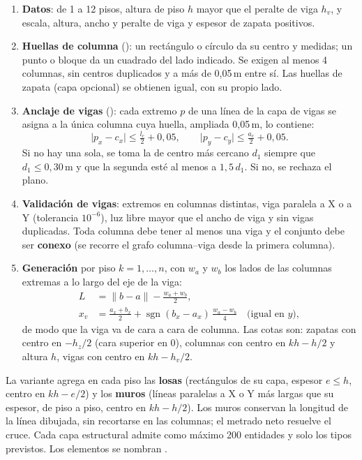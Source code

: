 \begin{enumerate}
	\item \textbf{Datos}: de 1 a 12 pisos, altura de piso $h$ mayor que el peralte de viga $h_v$, y escala, altura,
	      ancho y peralte de viga y espesor de zapata positivos.
	\item \textbf{Huellas de columna} (): un rectángulo o círculo da su centro y medidas; un
	      punto o bloque da un cuadrado del lado indicado. Se exigen al menos 4 columnas, sin centros duplicados y a más
	      de 0,05\,m entre sí. Las huellas de zapata (capa opcional) se obtienen igual, con su propio lado.
	\item \textbf{Anclaje de vigas} (): cada extremo $p$ de una línea de la capa de vigas
	      se asigna a la única columna cuya huella, ampliada 0,05\,m, lo contiene:
	      \begin{equation}
	      	\lvert p_x - c_x \rvert \le \tfrac{l_c}{2} + 0{,}05, \qquad \lvert p_y - c_y \rvert \le \tfrac{a_c}{2} + 0{,}05 .
	      \end{equation}
	      Si no hay una sola, se toma la de centro más cercano $d_1$ siempre que $d_1 \le 0{,}30$\,m y que la segunda
	      esté al menos a $1{,}5\,d_1$. Si no, se rechaza el plano.
	\item \textbf{Validación de vigas}: extremos en columnas distintas, viga paralela a X o a Y (tolerancia
	      $10^{-6}$), luz libre mayor que el ancho de viga y sin vigas duplicadas. Toda columna debe tener al menos una
	      viga y el conjunto debe ser \textbf{conexo} (se recorre el grafo columna--viga desde la primera columna).
	\item \textbf{Generación} por piso $k = 1, \dots, n$, con $w_a$ y $w_b$ los lados de las columnas extremas a lo
	      largo del eje de la viga:
	      \begin{align}
	      	L &= \lVert b - a \rVert - \tfrac{w_a + w_b}{2}, \\
	      	x_v &= \tfrac{a_x + b_x}{2} + \operatorname{sgn}(b_x - a_x)\, \tfrac{w_a - w_b}{4}
	      	\quad \text{(igual en } y\text{)},
	      \end{align}
	      de modo que la viga va de cara a cara de columna. Las cotas son: zapatas con centro en $-h_z/2$ (cara superior
	      en 0), columnas con centro en $k h - h/2$ y altura $h$, vigas con centro en $k h - h_v/2$.
\end{enumerate}

La variante  agrega en cada piso las \textbf{losas} (rectángulos
de su capa, espesor $e \le h$, centro en $k h - e/2$) y los \textbf{muros} (líneas paralelas a X o Y más largas que su
espesor, de piso a piso, centro en $k h - h/2$). Los muros conservan la longitud de la línea dibujada, sin recortarse
en las columnas; el metrado neto resuelve el cruce. Cada capa estructural admite como máximo 200 entidades y solo los
tipos previstos. Los elementos se nombran .

